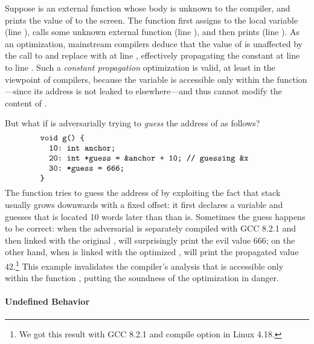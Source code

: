 \noindent Suppose  is an external function whose body is unknown to the compiler, and
 prints the value of  to the screen.  The function  first assigns
 to the local variable  (line ), calls some unknown external function
 (line ), and then prints  (line ).  As an optimization,
mainstream compilers deduce that the value of  is unaffected by the call to  and
replace  with  at line , effectively propagating the constant  at
line  to line .  Such a \emph{constant propagation} optimization is valid, at
least in the viewpoint of compilers, because the variable  is accessible only within the
function ---since its address is not leaked to elsewhere---and thus  cannot
modify the content of .

But what if  is adversarially trying to \emph{guess} the address of  as follows?
%
\[
\begin{minipage}{0.8\textwidth}
\begin{verbatim}
void g() {
  10: int anchor;
  20: int *guess = &anchor + 10; // guessing &x
  30: *guess = 666;
}
\end{verbatim}
\end{minipage}
\]
%
\noindent The function  tries to guess the address of  by exploiting the fact that
stack usually grows downwards with a fixed offset: it first declares a variable  and
guesses that  is located 10 words later than than  is.  Sometimes the guess
happens to be correct: when the adversarial  is separately compiled with GCC 8.2.1 and
then linked with the original ,  will surprisingly print the evil value 666; on
the other hand, when  is linked with the optimized ,  will print the
propagated value 42.\footnote{We got this result with GCC 8.2.1 and compile option
   in Linux 4.18.} This example invalidates the compiler's analysis that
 is accessible only within the function , putting the soundness of the
optimization in danger.


\paragraph{Undefined Behavior}

